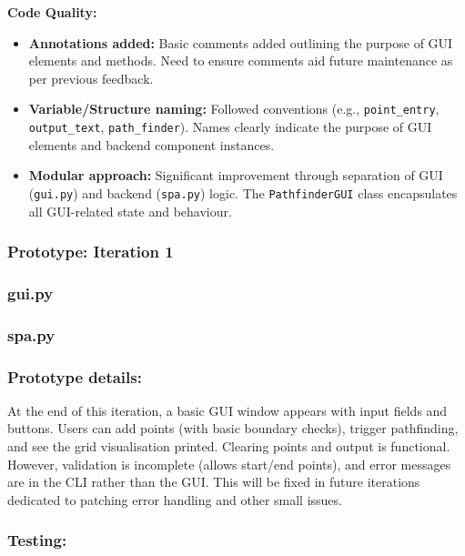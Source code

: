 \textbf{Code Quality:}
\begin{itemize}
	\item \textbf{Annotations added:} Basic comments added outlining the purpose of GUI elements and methods. Need to ensure comments aid future maintenance as per previous feedback.
	\item \textbf{Variable/Structure naming:} Followed conventions (e.g., \verb|point_entry|, \verb|output_text|, \verb|path_finder|). Names clearly indicate the purpose of GUI elements and backend component instances.
	\item \textbf{Modular approach:} Significant improvement through separation of GUI (\verb|gui.py|) and backend (\verb|spa.py|) logic. The \verb|PathfinderGUI| class encapsulates all GUI-related state and behaviour.
\end{itemize}

\newpage %

\subsubsection*{Prototype: Iteration 1}
\subsubsection{gui.py}


\subsubsection{spa.py}



\subsubsection{Prototype details:}
At the end of this iteration, a basic GUI window appears with input fields and buttons. Users can add points (with basic boundary checks), trigger pathfinding, and see the grid visualisation printed. Clearing points and output is functional. However, validation is incomplete (allows start/end points), and error messages are in the CLI rather than the GUI. This will be fixed in future iterations dedicated to patching error handling and other small issues.

\subsubsection{Testing:}

